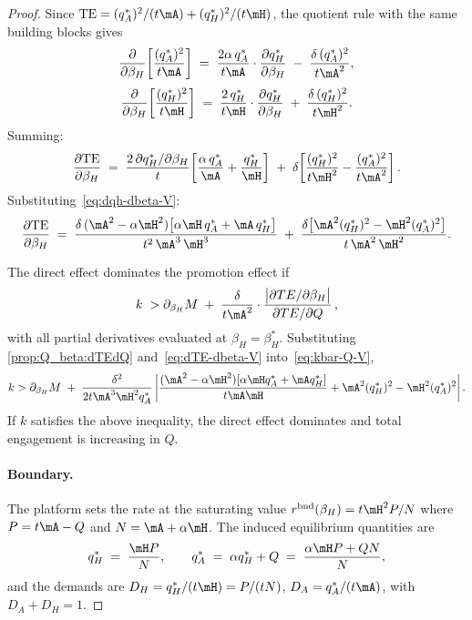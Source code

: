 \begin{proof}
Since $\text{TE} = (q_A^*)^2/(t\mA) + (q_H^*)^2/(t\mH)$, the quotient rule with the same building blocks gives
\[
\frac{\partial}{\partial\beta_H}\!\left[\frac{(q_A^*)^2}{t\mA}\right]
\;=\; \frac{2\alpha\,q_A^*}{t\mA}\cdot\frac{\partial q_H^*}{\partial\beta_H}
\;-\; \frac{\delta\,(q_A^*)^2}{t\mA^2},
\]
\[
\frac{\partial}{\partial\beta_H}\!\left[\frac{(q_H^*)^2}{t\mH}\right]
\;=\; \frac{2\,q_H^*}{t\mH}\cdot\frac{\partial q_H^*}{\partial\beta_H}
\;+\; \frac{\delta\,(q_H^*)^2}{t\mH^2}.
\]
Summing:
\[
\frac{\partial\text{TE}}{\partial\beta_H}
\;=\; \frac{2\,\partial q_H^*/\partial\beta_H}{t}\!\left[\frac{\alpha\,q_A^*}{\mA} + \frac{q_H^*}{\mH}\right]
\;+\; \delta\!\left[\frac{(q_H^*)^2}{t\mH^2} - \frac{(q_A^*)^2}{t\mA^2}\right].
\]
Substituting~\eqref{eq:dqh-dbeta-V}:
\begin{equation}\label{eq:dTE-dbeta-V}
\frac{\partial\text{TE}}{\partial\beta_H}
\;=\; \frac{\delta\,(\mA^2 - \alpha\mH^2)\bigl[\alpha\mH\, q_A^* + \mA\, q_H^*\bigr]}{t^2\,\mA^3\,\mH^3}
\;+\; \frac{\delta\bigl[\mA^2(q_H^*)^2 - \mH^2(q_A^*)^2\bigr]}{t\,\mA^2\,\mH^2}.
\end{equation}


The direct effect dominates the promotion effect if 
\begin{equation}\label{eq:kbar-Q-V}
k \;> \partial_{\beta_H}M
\;+\; \frac{\delta}{t\mA^2}\cdot\frac{\bigl|\partial TE/\partial\beta_H\bigr|}{\partial TE/\partial Q}\,,
\end{equation}
with all partial derivatives evaluated at $\beta_H = \beta_H^*$. Substituting \eqref{prop:Q_beta:dTEdQ} and~\eqref{eq:dTE-dbeta-V} into~\eqref{eq:kbar-Q-V}, 
\[
k > \partial_{\beta_H} M
\;+\; \frac{\delta^2}{2t\mA^3\mH^2 q_A^*}\left|\frac{(\mA^2 - \alpha\mH^2)[\alpha\mH q_A^* + \mA q_H^*]}{t\mA\mH} + \mA^2(q_H^*)^2 - \mH^2(q_A^*)^2\right|.
\]
If $k$ satisfies the above inequality, the direct effect dominates and total engagement is increasing in $Q$. 


\paragraph{Boundary.}
The platform sets the rate at the saturating value $r^{\mathrm{bnd}}(\beta_H) = t\mH^2 P / N$ where $P = t\mA - Q$ and $N = \mA + \alpha\mH$. The induced equilibrium quantities are
\[
q_H^* \;=\; \frac{\mH P}{N}, \qquad
q_A^* \;=\; \alpha q_H^* + Q \;=\; \frac{\alpha\mH P + QN}{N},
\]
and the demands are $D_H = q_H^*/(t\mH) = P/(tN)$, $D_A = q_A^*/(t\mA)$, with $D_A + D_H = 1$.


\end{proof}
